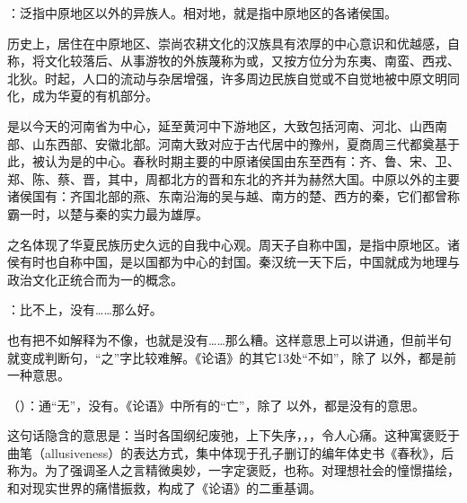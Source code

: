 {
\begin{lyblobitemize}
\item {}：泛指中原地区以外的异族人。相对地，就是指中原地区的各诸侯国。

历史上，居住在中原地区、崇尚农耕文化的汉族具有浓厚的中心意识和优越感，自称，将文化较落后、从事游牧的外族蔑称为或，又按方位分为东夷、南蛮、西戎、北狄。时起，人口的流动与杂居增强，许多周边民族自觉或不自觉地被中原文明同化，成为华夏的有机部分。

是以今天的河南省为中心，延至黄河中下游地区，大致包括河南、河北、山西南部、山东西部、安徽北部。河南大致对应于古代居中的豫州，夏商周三代都奠基于此，被认为是的中心。春秋时期主要的中原诸侯国由东至西有：齐、鲁、宋、卫、郑、陈、蔡、晋，其中，周都北方的晋和东北的齐并为赫然大国。中原以外的主要诸侯国有：齐国北部的燕、东南沿海的吴与越、南方的楚、西方的秦，它们都曾称霸一时，以楚与秦的实力最为雄厚。 %

之名体现了华夏民族历史久远的自我中心观。周天子自称中国，是指中原地区。诸侯有时也自称中国，是以国都为中心的封国。秦汉统一天下后，中国就成为地理与政治文化正统合而为一的概念。

\item {}：比不上，没有……那么好。

也有把不如解释为不像，也就是没有……那么糟。这样意思上可以讲通，但前半句就变成判断句，“之”字比较难解。《论语》的其它13处“不如”，除了  以外，都是前一种意思。

\item {}（）：通“无”，没有。《论语》中所有的“亡”，除了  以外，都是没有的意思。
\end{lyblobitemize}
这句话隐含的意思是：当时各国纲纪废弛，上下失序，，，令人心痛。这种寓褒贬于曲笔（allusiveness）的表达方式，集中体现于孔子删订的编年体史书《春秋》，后称为。为了强调圣人之言精微奥妙，一字定褒贬，也称。对理想社会的憧憬描绘，和对现实世界的痛惜振救，构成了《论语》的二重基调。
}
